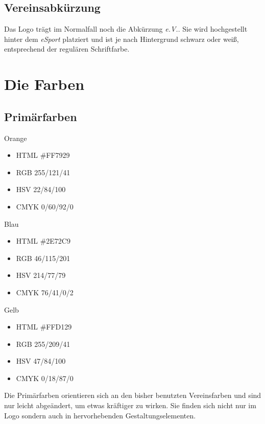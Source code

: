 \documentclass{article}
\begin{document}
\subsection{Vereinsabkürzung}

Das Logo trägt im Normalfall noch die Abkürzung \emph{e.V.}.
Sie wird hochgestellt hinter dem \emph{eSport} platziert und ist je nach Hintergrund schwarz oder weiß, entsprechend der regulären Schriftfarbe. %


\cleardoublepage
\section{Die Farben}

\subsection{Primärfarben}
\begin{samepage}
\cfield[LESOrange]
Orange
\begin{itemize}
\item HTML \#FF7929
\item RGB 255/121/41
\item HSV 22/84/100
\item CMYK 0/60/92/0
\end{itemize}
\end{samepage}

\begin{samepage}
\cfield[LESBlue]
Blau
\begin{itemize}
\item HTML \#2E72C9
\item RGB 46/115/201
\item HSV 214/77/79
\item CMYK 76/41/0/2
\end{itemize}
\end{samepage}

\begin{samepage}
\cfield[LESYellow]
Gelb
\begin{itemize}
\item HTML \#FFD129
\item RGB 255/209/41
\item HSV 47/84/100
\item CMYK 0/18/87/0
\end{itemize}
\end{samepage}

Die Primärfarben orientieren sich an den bisher benutzten Vereinsfarben und sind nur leicht abgeändert, um etwas kräftiger zu wirken.
Sie finden sich nicht nur im Logo sondern auch in hervorhebenden Gestaltungselementen.
\end{document}
